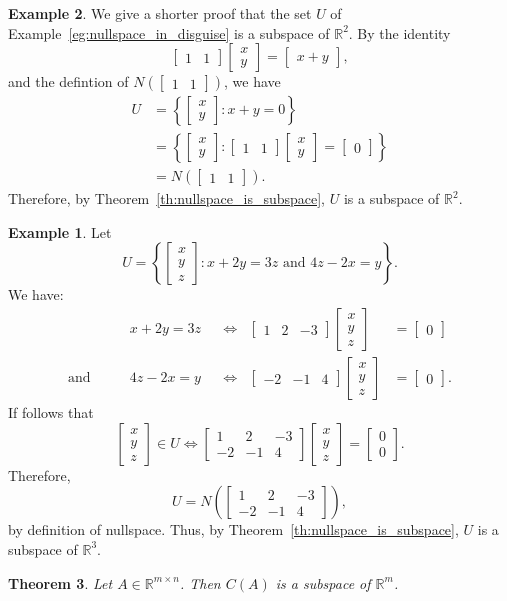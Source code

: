 \documentclass[12pt]{amsart}
\newcommand{\RR}{\mathbb{R}}
\newtheorem{theorem}{Theorem}[section]
\theoremstyle{definition} \newtheorem{definition}[theorem]{Definition}
\newtheorem{example}[theorem]{Example}
\newcommand{\mat}[1]{\begin{bmatrix}#1\end{bmatrix}}
\begin{document}
\begin{example}
  We give a shorter proof that the set $U$ of Example~\ref{eg:nullspace_in_disguise} is a subspace of $\RR^2$.
  By the identity
  \[
    \mat{1&1}\mat{x\\y} = \mat{x+y},
  \]
  and the defintion of $N\left(\mat{1&1}\right)$, we have
  \begin{align*}
    U &= \left\{\mat{x\\y} : x + y = 0\right\}\\
      &= \left\{\mat{x\\y} : \mat{1& 1}\mat{x\\y} =
        \mat{0}\right\}\\
      &= N\left(\mat{1&1}\right).
  \end{align*}
  Therefore, by Theorem~\ref{th:nullspace_is_subspace}, $U$ is a subspace of $\RR^2$.

\begin{example}
  Let
  \[
    U = \left\{\mat{x\\y\\z} : \text{$x + 2y = 3z$ and
    $4z - 2x = y$}\right\}.
  \]
  We have:
  \begin{align*}
    &x+2y=3z& &\Longleftrightarrow& \mat{1&2&-3}\mat{x\\y\\z}&=\mat{0}\\
    \text{and}\qquad& 4z-2x=y& &\Longleftrightarrow& 
    \mat{-2&-1&4}\mat{x\\y\\z}&=\mat{0}.
  \end{align*}
  If follows that
  \[
    \mat{x\\y\\z}\in U\Longleftrightarrow
    \mat{1&2&-3\\-2&-1&4}\mat{x\\y\\z}=\mat{0\\0}.
  \]
  Therefore,
  \[
    U = N\left(\mat{1&2&-3\\-2&-1&4}\right),
  \]
  by definition of nullspace.
  Thus, by Theorem~\ref{th:nullspace_is_subspace}, $U$ is a subspace of $\RR^3$.

\end{example}

\end{example}

\begin{theorem}\label{th:col_space_is_subspace}
  Let $A\in\RR^{m\times n}$. Then $C(A)$ is a subspace of $\RR^m$.
\end{theorem}
\end{document}
